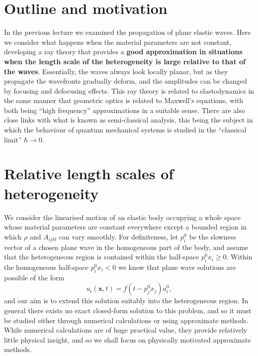 \section*{Outline and motivation}

In the previous lecture we examined the propagation of plane elastic waves. Here we consider what happens when the material 
parameters are not constant, 
developing a ray theory that provides a \textbf{good approximation in situations when the length scale of the 
heterogeneity is large relative to that of the waves}. Essentially, the waves always look locally 
planar, but as they propagate the wavefronts gradually deform, and the amplitudes can be changed by focusing 
and defocusing effects. This ray theory is related to elastodynamics in the same manner that 
geometric optics is related to Maxwell's equations, with both being ``high frequency'' approximations in a 
suitable sense. There are also close links with what is known as semi-classical analysis, this 
being the subject in which the behaviour of quantum mechanical systems is studied in the ``classical limit'' $\hbar\rightarrow0$.

\section*{Relative length scales of heterogeneity}

We consider the linearised motion of an elastic body occupying a whole space whose material parameters are 
constant everywhere except a bounded region in which $\rho$ and $A_{ijkl}$ can vary smoothly. 
For definiteness, let $p_{i}^{0}$ be the slowness vector of a chosen plane wave in the homogeneous part of the body, and 
assume that the heterogeneous region is contained within the half-space $p_{i}^{0}x_{i}\ge0$. 
Within the homogeneous half-space $p_{i}^{0}x_{i}<0$ we know that plane wave solutions are possible of the form
\begin{equation}
u_{i}(\mathbf{x},t)=f(t-p_{j}^{0}x_{j})a_{i}^{0},
\label{eq:1}
\end{equation}
and our aim is to extend this solution suitably into the heterogeneous region. In general there exists no exact
closed-form solution to this problem, and so it must be studied either through numerical calculations 
or using approximate methods. While numerical calculations are of huge practical value, they provide 
relatively little physical insight, and so we shall focus on physically motivated approximate methods.


